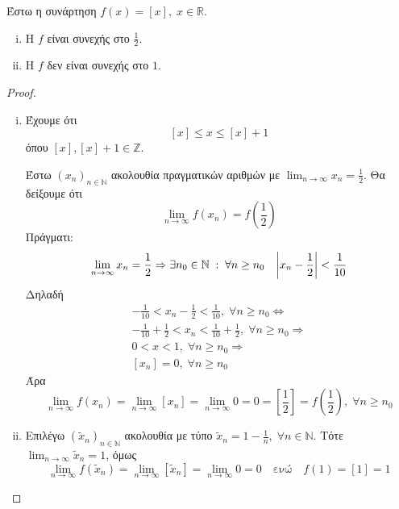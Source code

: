 \begin{example}
\item {}
  \begin{enumerate}[wide,labelindent=0pt]
    \item Έστω η συνάρτηση $ f(x) = [x], \; x \in \mathbb{R} $. 
      \begin{enumerate}[i.]
        \item Η $f$ είναι συνεχής στο $ \frac{1}{2} $.
        \item Η $f$ δεν είναι συνεχής στο $1$.
      \end{enumerate}

      \begin{proof}
      \item {}
        \begin{enumerate}[i.]
          \item Έχουμε ότι 
            \[
              [x] \leq x \leq [x]+1 
            \] 
            όπου $ [x], [x] + 1 \in \mathbb{Z} $. 

            Έστω $ {(x_{n})}_{n \in \mathbb{N}}$ ακολουθία 
            πραγματικών αριθμών με 
            $ \lim_{n \to \infty} x_{n} = \frac{1}{2} $. Θα δείξουμε ότι 
            \[ \lim_{n \to \infty} f(x_{n}) = 
            f\left(\frac{1}{2}\right) \] 
            Πράγματι:
            \[
              \lim_{n \to \infty} x_{n} = \frac{1}{2} \Rightarrow 
              \exists n_{0} \in \mathbb{N} \; : \; \forall n 
              \geq n_{0} \quad \abs{x_{n} - \frac{1}{2}} < \frac{1}{10} 
            \]
            Δηλαδή 
            \begin{gather*}
              -\frac{1}{10} < x_{n} - \frac{1}{2} < \frac{1}{10}, 
              \; \forall n \geq n_{0} \Leftrightarrow \\
              - \frac{1}{10} + \frac{1}{2} < x_{n} < 
              \frac{1}{10} + \frac{1}{2}, \; \forall n \geq n_{0} 
              \Rightarrow  \\ 0 < x <1, \; \forall n \geq n_{0} 
              \Rightarrow \\ [x_{n}] = 0, \; \forall n \geq n_{0}
            \end{gather*}
            Άρα 
            \[
              \lim_{n \to \infty} f(x_{n}) = 
              \lim_{n \to \infty} [x_{n}] = 
              \lim_{n \to \infty} 0 = 0 = \left[\frac{1}{2} \right] = 
              f\left(\frac{1}{2}\right), \; \forall n \geq n_{0} 
            \] 

          \item 
            Επιλέγω $ {(\tilde{x}_{n})}_{ n \in \mathbb{N}} $ 
            ακολουθία με τύπο 
            $ \tilde{x}_{n} = 1 - \frac{1}{n}, \; \forall n \in 
            \mathbb{N} $. Τότε
            $ \lim_{n \to \infty} \tilde{x}_{n} = 1 $, όμως 
            \[
              \lim_{n \to \infty} f(\tilde{x}_{n}) = 
              \lim_{n \to \infty} 
              [\tilde{x}_{n}] = \lim_{n \to \infty} 0 = 0 \quad 
              \text{ενώ} \quad  f(1) = [1] = 1 
            \] 
        \end{enumerate}
      \end{proof}
  \end{enumerate}
\end{example}


